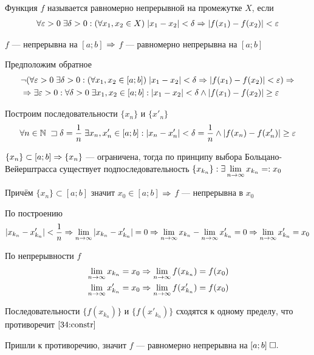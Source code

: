 \documentclass{article}
\begin{document}


Функция $f$  называется равномерно непрерывной на промежутке $X$, если
\begin{align*}
	\forall\eps>0\;\exists\delta>0:(\forall x_1,x_2\in X)\;|x_1-x_2|<\delta\Rarr |f(x_1)-f(x_2)|<\eps
\end{align*}

\theorem[Кантора]

$f$ --- непрерывна на $[a;b]$ $\Rarr$ $f$ --- равномерно непрерывна на $[a;b]$

\proof

Предположим обратное
\begin{align*}
	 & \lnot(\forall\eps>0\;\exists\delta>0:(\forall x_1,x_2\in [a;b])\;|x_1-x_2|<\delta\Rarr |f(x_1)-f(x_2)|<\eps)\Rarr \\
	 & \Rarr\exists\eps>0:\forall\delta>0\;\exists x_1,x_2\in [a;b]:|x_1-x_2|<\delta\land|f(x_1)-f(x_2)|\geq\eps
\end{align*}

Построим последовательности $\{x_{n}\}$ и  $\{x'_{n}\}$
\begin{align}
	\forall n\in\N\;\llet\delta=\frac{1}{n}\;\exists x_{n},x'_{n}\in [a;b]:|x_{n}-x'_{n}|<\delta=\frac{1}{n}\land|f(x_{n})-f(x'_{n})|\geq\eps\label{34:constr}
\end{align}

$\{x_{n}\}\subset[a;b]\Rarr\{x_{n}\}$ --- ограничена, тогда по принципу выбора Больцано-Вейерштрасса существует подпоследовательность $\{x_{k_{n}}\}:\exists\slimty x_{k_{n}}=:x_0$

Причём $\{x_{n}\}\subset[a;b]$ значит $x_0\in[a;b]$ $\Rarr$ $f$ --- непрерывна в $x_0$

По построению
\begin{align*}
	|x_{k_{n}}-x'_{k_{n}}|<\frac{1}{n}\Rarr\slimty|x_{k_{n}}-x'_{k_{n}}|=0\Rarr\slimty x_{k_{n}}-\slimty x'_{k_{n}}=0\Rarr\slimty x'_{k_{n}}=x_0
\end{align*}

По непрерывности $f$
\begin{align*}
	 & \slimty x_{k_{n}}=x_0\Rarr\slimty f(x_{k_{n}})=f(x_0)   \\
	 & \slimty x'_{k_{n}}=x_0\Rarr\slimty f(x'_{k_{n}})=f(x_0)
\end{align*}

Последовательности $\{f(x_{k_{n}})\}$ и $\{f(x'_{k_{n}})\}$ сходятся к одному пределу, что противоречит $\eqref{34:constr}$

Пришли к противоречию, значит $f$ --- равномерно непрерывна на $[a;b]\qed$
\end{document}
